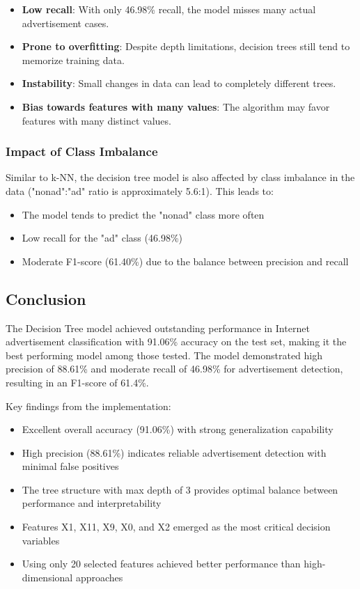 \begin{itemize}
    \item \textbf{Low recall}: With only 46.98\% recall, the model misses many actual advertisement cases.
    \item \textbf{Prone to overfitting}: Despite depth limitations, decision trees still tend to memorize training data.
    \item \textbf{Instability}: Small changes in data can lead to completely different trees.
    \item \textbf{Bias towards features with many values}: The algorithm may favor features with many distinct values.
\end{itemize}

\subsubsection{Impact of Class Imbalance}

Similar to k-NN, the decision tree model is also affected by class imbalance in the data ("nonad":"ad" ratio is approximately 5.6:1). This leads to:

\begin{itemize}
    \item The model tends to predict the "nonad" class more often
    \item Low recall for the "ad" class (46.98\%)
    \item Moderate F1-score (61.40\%) due to the balance between precision and recall
\end{itemize}

\subsection{Conclusion}

The Decision Tree model achieved outstanding performance in Internet advertisement classification with 91.06\% accuracy on the test set, making it the best performing model among those tested. The model demonstrated high precision of 88.61\% and moderate recall of 46.98\% for advertisement detection, resulting in an F1-score of 61.4\%. 

Key findings from the implementation:
\begin{itemize}
    \item Excellent overall accuracy (91.06\%) with strong generalization capability
    \item High precision (88.61\%) indicates reliable advertisement detection with minimal false positives
    \item The tree structure with max depth of 3 provides optimal balance between performance and interpretability
    \item Features X1, X11, X9, X0, and X2 emerged as the most critical decision variables
    \item Using only 20 selected features achieved better performance than high-dimensional approaches
\end{itemize}

